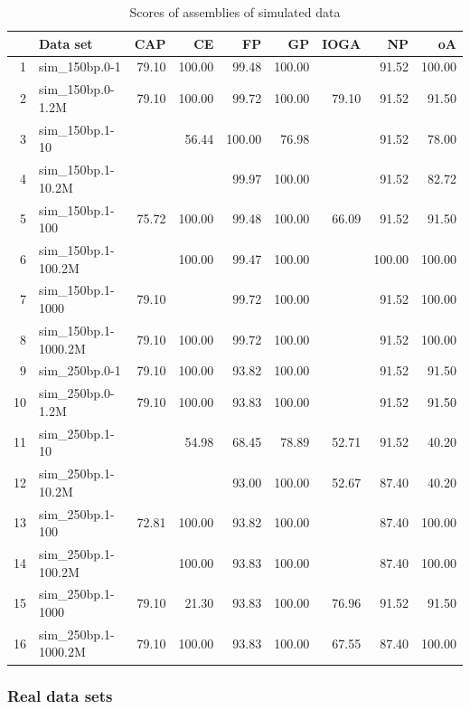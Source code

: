 \begin{table}[ht]
\caption{Scores of assemblies of simulated data}
\label{tab:scores_simulated}
\centering
  \begin{tabular}{rlrrrrrrr}
 \hline
 & Data set & CAP & CE & FP & GP & IOGA & NP & oA \\ 
 \hline
 1 & sim\_150bp.0-1 & 79.10 & 100.00 & 99.48 & 100.00 & & 91.52 & 100.00 \\ 
 2 & sim\_150bp.0-1.2M & 79.10 & 100.00 & 99.72 & 100.00 & 79.10 & 91.52 & 91.50 \\ 
 3 & sim\_150bp.1-10 & & 56.44 & 100.00 & 76.98 & & 91.52 & 78.00 \\ 
 4 & sim\_150bp.1-10.2M & & & 99.97 & 100.00 & & 91.52 & 82.72 \\ 
 5 & sim\_150bp.1-100 & 75.72 & 100.00 & 99.48 & 100.00 & 66.09 & 91.52 & 91.50 \\ 
 6 & sim\_150bp.1-100.2M & & 100.00 & 99.47 & 100.00 & & 100.00 & 100.00 \\ 
 7 & sim\_150bp.1-1000 & 79.10 & & 99.72 & 100.00 & & 91.52 & 100.00 \\ 
 8 & sim\_150bp.1-1000.2M & 79.10 & 100.00 & 99.72 & 100.00 & & 91.52 & 100.00 \\ 
 9 & sim\_250bp.0-1 & 79.10 & 100.00 & 93.82 & 100.00 & & 91.52 & 91.50 \\ 
 10 & sim\_250bp.0-1.2M & 79.10 & 100.00 & 93.83 & 100.00 & & 91.52 & 91.50 \\ 
 11 & sim\_250bp.1-10 & & 54.98 & 68.45 & 78.89 & 52.71 & 91.52 & 40.20 \\ 
 12 & sim\_250bp.1-10.2M & & & 93.00 & 100.00 & 52.67 & 87.40 & 40.20 \\ 
 13 & sim\_250bp.1-100 & 72.81 & 100.00 & 93.82 & 100.00 & & 87.40 & 100.00 \\ 
 14 & sim\_250bp.1-100.2M & & 100.00 & 93.83 & 100.00 & & 87.40 & 100.00 \\ 
 15 & sim\_250bp.1-1000 & 79.10 & 21.30 & 93.83 & 100.00 & 76.96 & 91.52 & 91.50 \\ 
 16 & sim\_250bp.1-1000.2M & 79.10 & 100.00 & 93.83 & 100.00 & 67.55 & 87.40 & 100.00 \\
 \hline
\end{tabular}%
\end{table}

\subsubsection{Real data sets}

